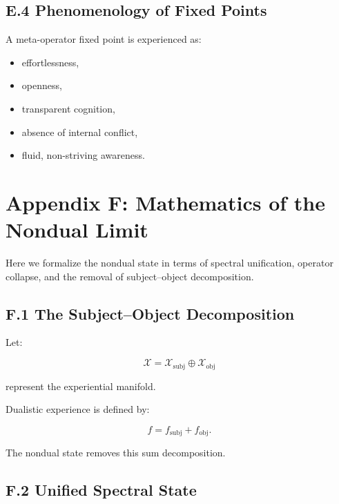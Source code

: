 \documentclass[12pt]{article}
\begin{document}
\subsection*{E.4 Phenomenology of Fixed Points}

A meta-operator fixed point is experienced as:
\begin{itemize}
\item effortlessness,
\item openness,
\item transparent cognition,
\item absence of internal conflict,
\item fluid, non-striving awareness.
\end{itemize}


\section*{Appendix F: Mathematics of the Nondual Limit}

Here we formalize the nondual state in terms of spectral unification,
operator collapse, and the removal of subject–object decomposition.

\subsection*{F.1 The Subject–Object Decomposition}

Let:

\[
\mathcal{X} = \mathcal{X}_{\mathrm{subj}} \oplus \mathcal{X}_{\mathrm{obj}}
\]

represent the experiential manifold.

Dualistic experience is defined by:

\[
f = f_{\mathrm{subj}} + f_{\mathrm{obj}}.
\]

The nondual state removes this sum decomposition.

\subsection*{F.2 Unified Spectral State}
\end{document}
